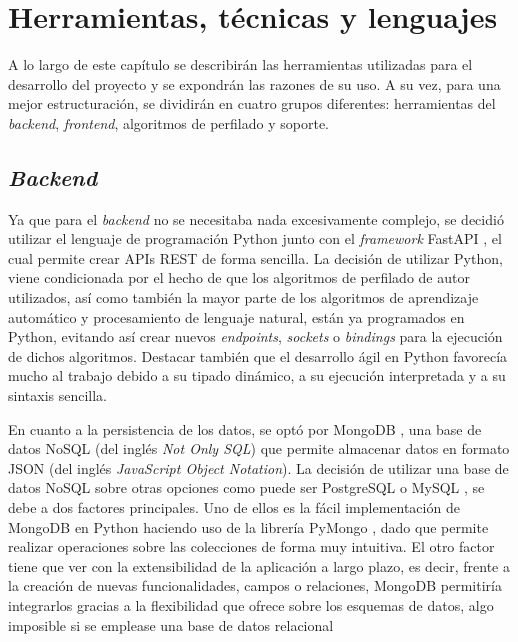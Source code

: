 \chapter{Herramientas, técnicas y lenguajes}
\label{chap:herramientas}

A lo largo de este capítulo se describirán las herramientas utilizadas para el desarrollo del proyecto y se expondrán las
razones de su uso. A su vez, para una mejor estructuración, se dividirán en cuatro grupos diferentes:
herramientas del \textit{backend}, \textit{frontend}, algoritmos de perfilado y  soporte.
	
\section{\textit{Backend}}
\label{sec:herramientas_backend}

Ya que para el \textit{backend} no se necesitaba nada excesivamente complejo, se decidió utilizar el lenguaje de programación Python \cite{python} junto
con el \textit{framework} FastAPI \cite{fastapi}, el cual permite crear APIs REST de forma sencilla. La decisión de utilizar Python, viene
condicionada por el hecho de que los algoritmos de perfilado de autor utilizados, así como también la mayor parte de los algoritmos de aprendizaje automático
y procesamiento de lenguaje natural, 
están ya programados en Python, evitando así crear nuevos \textit{endpoints}, \textit{sockets} o \textit{bindings} para la ejecución de dichos algoritmos.
Destacar también que el desarrollo ágil en Python favorecía mucho al trabajo debido a su tipado dinámico, a su ejecución interpretada y a su sintaxis sencilla.

\bigskip
En cuanto a la persistencia de los datos, se optó por MongoDB \cite{mongodb}, una base de datos NoSQL (del inglés \textit{Not Only SQL}) que permite almacenar
datos en formato JSON (del inglés \textit{JavaScript Object Notation}). La decisión de utilizar una base de datos NoSQL sobre otras opciones como puede ser
PostgreSQL \cite{postgresql} o MySQL \cite{mysql}, se debe a dos factores principales. Uno de ellos es la fácil implementación de MongoDB en Python
haciendo uso de la librería PyMongo \cite{pymongo}, dado que permite realizar operaciones sobre las colecciones de forma muy intuitiva.
El otro factor tiene que ver con la extensibilidad de la aplicación a largo plazo, es decir, frente a la creación de nuevas funcionalidades,
campos o relaciones, MongoDB permitiría integrarlos gracias a la flexibilidad que ofrece sobre los esquemas de datos, algo imposible 
si se emplease una base de datos relacional

